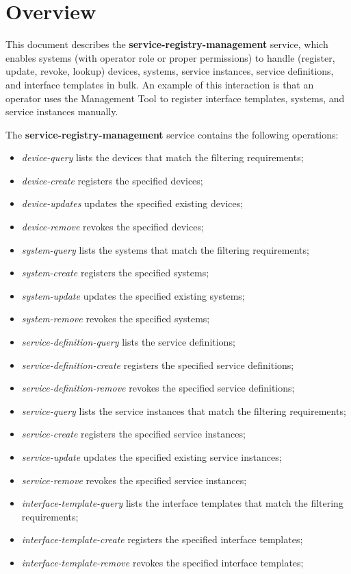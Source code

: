 \documentclass[a4paper]{arrowhead}
\begin{document}
\section{Overview}
\label{sec:overview}
This document describes the \textbf{service-registry-management} service, which enables systems (with operator role or proper permissions) to handle (register, update, revoke, lookup) devices, systems, service instances, service definitions, and interface templates in bulk. An example of this interaction is that an operator uses the Management Tool to register interface templates, systems, and service instances manually.

The \textbf{service-registry-management} service contains the following operations:

\begin{itemize}
    \item \textit{device-query} lists the devices that match the filtering requirements;
    \item \textit{device-create} registers the specified devices;
    \item \textit{device-updates} updates the specified existing devices;
    \item \textit{device-remove} revokes the specified devices;
    \item \textit{system-query} lists the systems that match the filtering requirements;
    \item \textit{system-create} registers the specified systems;
    \item \textit{system-update} updates the specified existing systems;
    \item \textit{system-remove} revokes the specified systems;
    \item \textit{service-definition-query} lists the service definitions;
    \item \textit{service-definition-create} registers the specified service definitions;
    \item \textit{service-definition-remove} revokes the specified service definitions;
    \item \textit{service-query} lists the service instances that match the filtering requirements;
    \item \textit{service-create} registers the specified service instances;
    \item \textit{service-update} updates the specified existing service instances;
    \item \textit{service-remove} revokes the specified service instances;
    \item \textit{interface-template-query} lists the interface templates that match the filtering requirements;
    \item \textit{interface-template-create} registers the specified interface templates;
    \item \textit{interface-template-remove} revokes the specified interface templates;
    
\end{itemize}
\end{document}
